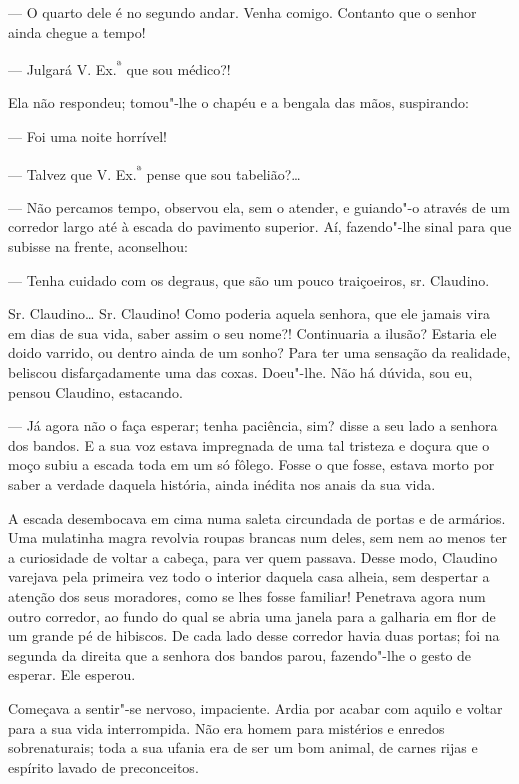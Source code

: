 --- O quarto dele é no segundo andar. Venha comigo. Contanto que o
senhor ainda chegue a tempo!

--- Julgará V. Ex.\textsuperscript{ª} que sou médico?!

Ela não respondeu; tomou"-lhe o chapéu e a bengala das mãos, suspirando:

--- Foi uma noite horrível!

--- Talvez que V. Ex.\textsuperscript{ª} pense que sou tabelião?\ldots{}

--- Não percamos tempo, observou ela, sem o atender, e guiando"-o através
de um corredor largo até à escada do pavimento superior. Aí, fazendo"-lhe
sinal para que subisse na frente, aconselhou:

--- Tenha cuidado com os degraus, que são um pouco traiçoeiros, sr.
Claudino.

Sr. Claudino\ldots{} Sr. Claudino! Como poderia aquela senhora, que ele
jamais vira em dias de sua vida, saber assim o seu nome?! Continuaria a
ilusão? Estaria ele doido varrido, ou dentro ainda de um sonho? Para ter
uma sensação da realidade, beliscou disfarçadamente uma das coxas.
Doeu"-lhe. Não há dúvida, sou eu, pensou Claudino, estacando.

--- Já agora não o faça esperar; tenha paciência, sim? disse a seu lado
a senhora dos bandos. E a sua voz estava impregnada de uma tal tristeza
e doçura que o moço subiu a escada toda em um só fôlego. Fosse o que
fosse, estava morto por saber a verdade daquela história, ainda inédita
nos anais da sua vida.

A escada desembocava em cima numa saleta circundada de portas e de
armários. Uma mulatinha magra revolvia roupas brancas num deles, sem nem
ao menos ter a curiosidade de voltar a cabeça, para ver quem passava.
Desse modo, Claudino varejava pela primeira vez todo o interior daquela
casa alheia, sem despertar a atenção dos seus moradores, como se lhes
fosse familiar! Penetrava agora num outro corredor, ao fundo do qual se
abria uma janela para a galharia em flor de um grande pé de hibiscos. De
cada lado desse corredor havia duas portas; foi na segunda da direita
que a senhora dos bandos parou, fazendo"-lhe o gesto de esperar. Ele esperou.

Começava a sentir"-se nervoso, impaciente. Ardia por acabar com aquilo e
voltar para a sua vida interrompida. Não era homem para mistérios e
enredos sobrenaturais; toda a sua ufania era de ser um bom animal, de
carnes rijas e espírito lavado de preconceitos.

